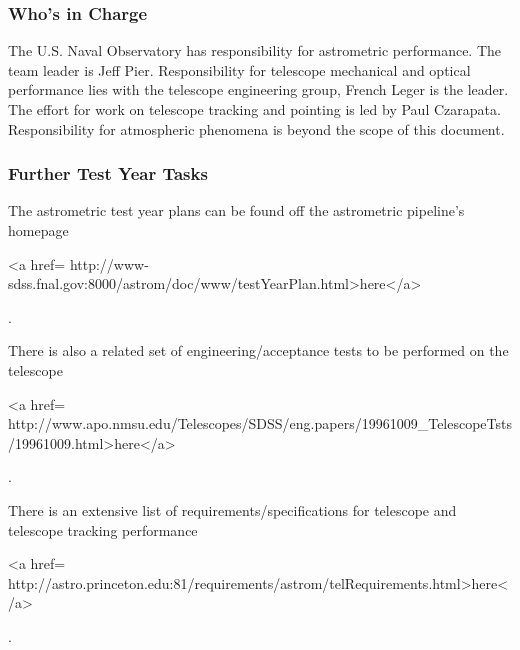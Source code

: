 \subsubsection{Who's in Charge}
The U.S. Naval Observatory has responsibility for astrometric 
performance.  The team leader is Jeff Pier.  Responsibility for
telescope mechanical and optical performance lies with the telescope
engineering group, French Leger is the leader.  The effort for work on
telescope tracking and pointing is led by Paul Czarapata. 
Responsibility for atmospheric phenomena is beyond the scope of this document.

\subsubsection{Further Test Year Tasks}
The astrometric test year plans can be found off the astrometric
pipeline's homepage 
\begin{rawhtml}
<a href=
http://www-sdss.fnal.gov:8000/astrom/doc/www/testYearPlan.html>here</a>\end{rawhtml}. 

\noindent There is also a related set of engineering/acceptance tests to be
performed on the telescope 
\begin{rawhtml}
<a href=
http://www.apo.nmsu.edu/Telescopes/SDSS/eng.papers/19961009_TelescopeTsts/19961009.html>here</a>\end{rawhtml}.

\noindent There is an extensive list of requirements/specifications for
telescope and telescope tracking performance 
\begin{rawhtml}
<a href=
http://astro.princeton.edu:81/requirements/astrom/telRequirements.html>here</a>\end{rawhtml}.

